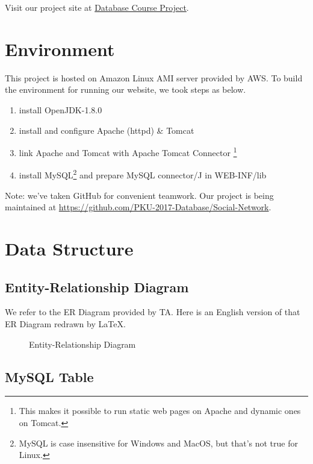 Visit our project site at \href{http://54.250.244.23/database-project/db/main.jsp}{Database Course Project}.

\section{Environment}

This project is hosted on Amazon Linux AMI server provided by AWS. To build the environment for running our website, we took steps as below.

\begin{enumerate}
	\item install OpenJDK-1.8.0
	\item install and configure Apache (httpd) \& Tomcat
	\item link Apache and Tomcat with Apache Tomcat Connector \footnote{This makes it possible to run static web pages on Apache and dynamic ones on Tomcat.}
	\item install MySQL\footnote{MySQL is case insensitive for Windows and MacOS, but that's not true for Linux.} and prepare MySQL connector/J in WEB-INF/lib
\end{enumerate}

Note: we've taken GitHub for convenient teamwork. Our project is being maintained at \url{https://github.com/PKU-2017-Database/Social-Network}.

\section{Data Structure}

\subsection{Entity-Relationship Diagram}

We refer to the ER Diagram provided by TA. Here is an English version of that ER Diagram redrawn by \LaTeX.

\begin{figure}[htbp]
	\begin{center}
		
	\end{center}
	\caption{Entity-Relationship Diagram}
\end{figure}

\subsection{MySQL Table}

